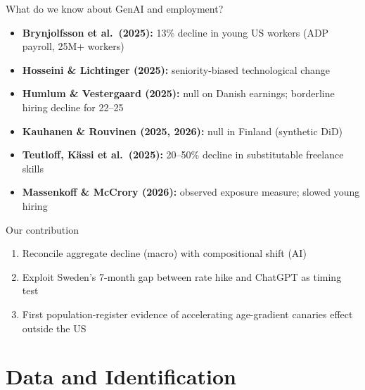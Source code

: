 \documentclass[aspectratio=169,11pt]{beamer}
\begin{document}
\begin{frame}{What do we know about GenAI and employment?}
\begin{itemize}
    \item \textbf{Brynjolfsson et al.\ (2025):} 13\% decline in young US workers (ADP payroll, 25M+ workers)
    \item \textbf{Hosseini \& Lichtinger (2025):} seniority-biased technological change
    \item \textbf{Humlum \& Vestergaard (2025):} null on Danish earnings; borderline hiring decline for 22--25
    \item \textbf{Kauhanen \& Rouvinen (2025, 2026):} null in Finland (synthetic DiD)
    \item \textbf{Teutloff, Kässi et al.\ (2025):} 20--50\% decline in substitutable freelance skills
    \item \textbf{Massenkoff \& McCrory (2026):} observed exposure measure; slowed young hiring
\end{itemize}
\vspace{2mm}
\begin{block}{Our contribution}
\begin{enumerate}
    \item Reconcile aggregate decline (macro) with compositional shift (AI)
    \item Exploit Sweden's 7-month gap between rate hike and ChatGPT as timing test
    \item First population-register evidence of accelerating age-gradient canaries effect outside the US
\end{enumerate}
\end{block}
\end{frame}

\section{Data and Identification}
\end{document}
